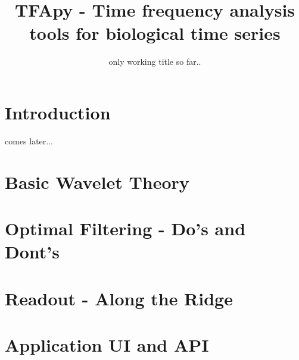 \documentclass[notitlepage]{scrartcl}
\begin{document}
\title{TFApy - Time frequency analysis tools for biological time series}
\subtitle{only working title so far..}

\maketitle
\section{Introduction}

comes later...

\section{Basic Wavelet Theory}


\section{Optimal Filtering - Do's and Dont's}

\section{Readout - Along the Ridge}

\section{Application UI and API}


\end{document}
